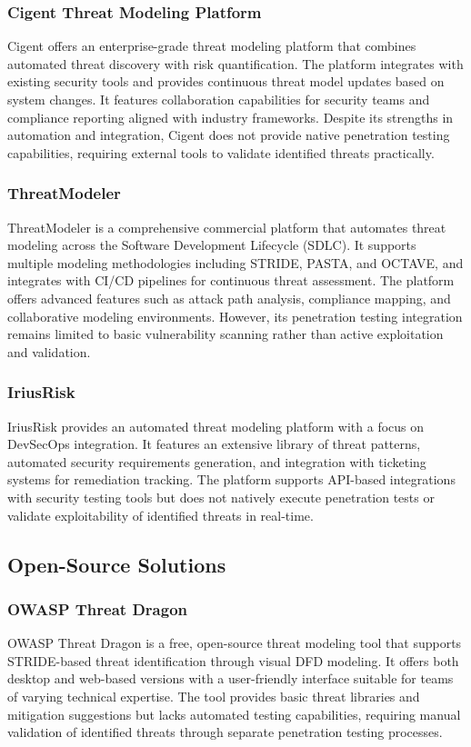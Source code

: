\subsubsection{Cigent Threat Modeling Platform}
Cigent offers an enterprise-grade threat modeling platform that combines automated threat discovery with risk quantification. The platform integrates with existing security tools and provides continuous threat model updates based on system changes. It features collaboration capabilities for security teams and compliance reporting aligned with industry frameworks. Despite its strengths in automation and integration, Cigent does not provide native penetration testing capabilities, requiring external tools to validate identified threats practically.

\subsubsection{ThreatModeler}
ThreatModeler is a comprehensive commercial platform that automates threat modeling across the Software Development Lifecycle (SDLC). It supports multiple modeling methodologies including STRIDE, PASTA, and OCTAVE, and integrates with CI/CD pipelines for continuous threat assessment. The platform offers advanced features such as attack path analysis, compliance mapping, and collaborative modeling environments. However, its penetration testing integration remains limited to basic vulnerability scanning rather than active exploitation and validation.

\subsubsection{IriusRisk}
IriusRisk provides an automated threat modeling platform with a focus on DevSecOps integration. It features an extensive library of threat patterns, automated security requirements generation, and integration with ticketing systems for remediation tracking. The platform supports API-based integrations with security testing tools but does not natively execute penetration tests or validate exploitability of identified threats in real-time.

\subsection{Open-Source Solutions}

\subsubsection{OWASP Threat Dragon}
OWASP Threat Dragon is a free, open-source threat modeling tool that supports STRIDE-based threat identification through visual DFD modeling. It offers both desktop and web-based versions with a user-friendly interface suitable for teams of varying technical expertise. The tool provides basic threat libraries and mitigation suggestions but lacks automated testing capabilities, requiring manual validation of identified threats through separate penetration testing processes.

